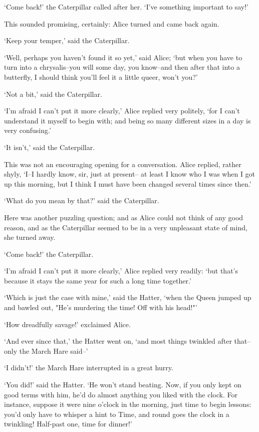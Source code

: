 \documentclass[statementpaper,twoside,openany]{memoir}
\begin{document}
`Come back!' the Caterpillar called after her. `I've something important to say!'

This sounded promising, certainly: Alice turned and came back again.

`Keep your temper,' said the Caterpillar.

`Well, perhaps you haven't found it so yet,' said Alice; `but when you have to turn into a chrysalis--you will some day, you know--and then after that into a butterfly, I should think you'll feel it a little queer, won't you?'

`Not a bit,' said the Caterpillar.

`I'm afraid I can't put it more clearly,' Alice replied very politely, `for I can't understand it myself to begin with; and being so many different sizes in a day is very confusing.'

`It isn't,' said the Caterpillar.

This was not an encouraging opening for a conversation. Alice replied, rather shyly, `I--I hardly know, sir, just at present-- at least I know who I was when I got up this morning, but I think I must have been changed several times since then.'

`What do you mean by that?' said the Caterpillar.

Here was another puzzling question; and as Alice could not think of any good reason, and as the Caterpillar seemed to be in a very unpleasant state of mind, she turned away.

`Come back!' the Caterpillar.

`I'm afraid I can't put it more clearly,' Alice replied very readily: `but that's because it stays the same year for such a long time together.'

`Which is just the case with mine,' said the Hatter, `when the Queen jumped up and bawled out, "He's murdering the time! Off with his head!"'

`How dreadfully savage!' exclaimed Alice.

`And ever since that,' the Hatter went on, `and most things twinkled after that--only the March Hare said--'

`I didn't!' the March Hare interrupted in a great hurry.

`You did!' said the Hatter. `He won't stand beating. Now, if you only kept on good terms with him, he'd do almost anything you liked with the clock. For instance, suppose it were nine o'clock in the morning, just time to begin lessons: you'd only have to whisper a hint to Time, and round goes the clock in a twinkling! Half-past one, time for dinner!'
\end{document}
